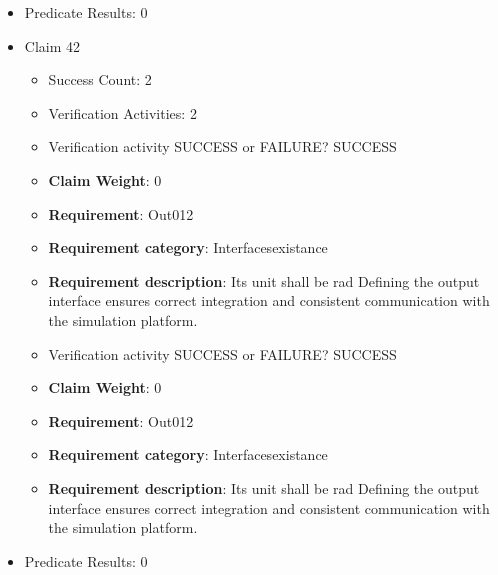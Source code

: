 \documentclass{article}
\begin{document}
\begin{itemize}
\begin{itemize}
					\item Verification activity SUCCESS or FAILURE? SUCCESS
					\item \textbf{Claim Weight}: 0
						\item \textbf{Requirement}: Out011 
						\item \textbf{Requirement category}: Interfacesexistance 
						\item \textbf{Requirement description}: Its unit shall be noUnit Defining the output interface ensures correct integration and consistent communication with the simulation platform.
					
				\end{itemize}
				
									    
				\item Predicate Results: 0

  				  \item Claim 42
				\begin{itemize}
			    	\item Success Count: 2 
			    	\item Verification Activities: 2
					\item Verification activity SUCCESS or FAILURE? SUCCESS
					\item \textbf{Claim Weight}: 0
						\item \textbf{Requirement}: Out012 
						\item \textbf{Requirement category}: Interfacesexistance 
						\item \textbf{Requirement description}: Its unit shall be rad Defining the output interface ensures correct integration and consistent communication with the simulation platform.
					
					\item Verification activity SUCCESS or FAILURE? SUCCESS
					\item \textbf{Claim Weight}: 0
						\item \textbf{Requirement}: Out012 
						\item \textbf{Requirement category}: Interfacesexistance 
						\item \textbf{Requirement description}: Its unit shall be rad Defining the output interface ensures correct integration and consistent communication with the simulation platform.
					
				\end{itemize}
				
									    
				\item Predicate Results: 0


\end{itemize}
\end{document}
